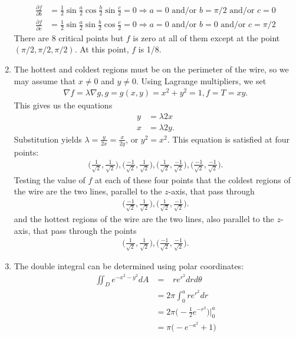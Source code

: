 \documentclass{article}
\begin{document}
\begin{enumerate}
\begin{align*}
  \frac{\partial f}{\partial b} &=  \frac{1}{2}\sin\frac{a}{2}  \cos\frac{b}{2}  \sin\frac{c}{2} =0 \Rightarrow a=0 \text{ and/or } b=\pi/2\text{ and/or } c=0\\
  \frac{\partial f}{\partial c} &=  \frac{1}{2}\sin\frac{a}{2}  \sin\frac{b}{2}  \cos\frac{c}{2} =0 \Rightarrow a=0 \text{ and/or } b=0\text{ and/or } c=\pi/2    
\end{align*}
There are 8 critical points but $f$ is zero at all of them except at the point $(\pi/2,\pi/2,\pi/2)$. At this point, $f$ is 1/8. 
\item %
The hottest and coldest regions must be on the perimeter of the wire, so we may assume that $x\ne0$ and $y\ne0$. Using Lagrange multipliers, we set
\begin{align*}
  \nabla f = \lambda \nabla g, g=g(x,y)=x^2+y^2=1, f=T=xy.
\end{align*}
This gives us the equations
\begin{align*}
 y&=\lambda 2x \\
  x&=\lambda 2y.
\end{align*}
Substitution yields $\lambda = \frac{y}{2x}=\frac{x}{2y}$, or $y^2=x^2$. This equation is satisfied at four points:
\begin{align*}
 \Big(\frac{1}{\sqrt{2}},\frac{1}{\sqrt{2}}\Big),
 \Big(\frac{-1}{\sqrt{2}},\frac{1}{\sqrt{2}}\Big),
 \Big(\frac{1}{\sqrt{2}},\frac{-1}{\sqrt{2}}\Big),
 \Big(\frac{-1}{\sqrt{2}},\frac{-1}{\sqrt{2}}\Big).
\end{align*}
Testing the value of $f$ at each of these four points that the coldest regions of the wire are the two lines, parallel to the $z$-axis, that pass through 
\begin{align*}
 \Big(\frac{-1}{\sqrt{2}},\frac{1}{\sqrt{2}}\Big),
 \Big(\frac{1}{\sqrt{2}},\frac{-1}{\sqrt{2}}\Big).
\end{align*}
and the hottest regions of the wire are the two lines, also parallel to the $z$-axis, that pass through the points
\begin{align*}
 \Big(\frac{1}{\sqrt{2}},\frac{1}{\sqrt{2}}\Big),
 \Big(\frac{-1}{\sqrt{2}},\frac{-1}{\sqrt{2}}\Big).
\end{align*}
\item %
The double integral can be determined using polar coordinates:
\begin{align*}
\iint_De^{-x^2-y^2}dA 
&=
  \mathop{\int_0^{2\pi} \!\! \int_{0}^a} re^{r^2}drd\theta\\
  &=2\pi\int_0^are^{r^2}dr \\
  &=2\pi\big(-\frac{1}{2}e^{-r^2}\big)\big|_0^a\\
  &=\pi\big(-e^{-a^2}+1\big)
\end{align*}


\end{enumerate}
\end{document}
